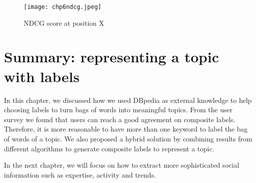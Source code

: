 \begin{figure}[htp]
\centering
\texttt{[image: chp6ndcg.jpeg]}  
\caption{NDCG score at position X}
\label{fig:chp6ndcg} 
\end{figure}




\section{Summary: representing a topic with labels}
In this chapter, we discussed how we used DBpedia as external knowledge to help choosing labels to turn bags of words into meaningful topics. From the user survey we found that users can reach a good agreement on composite labels. Therefore, it is more reasonable to have more than one keyword to label the bag of words of a topic. We also proposed a hybrid solution by combining results from different algorithms to generate composite labels to represent a topic. 

In the next chapter, we will focus on how to extract more sophisticated social information such as expertise, activity and trends.
